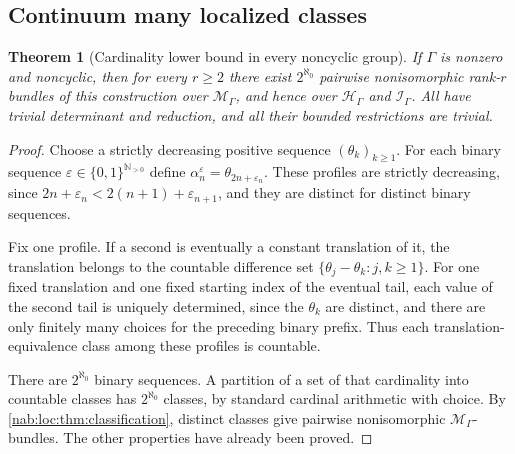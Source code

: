 \documentclass[11pt,letterpaper]{article}
\newtheorem{theorem}{Theorem}[section]
\theoremstyle{definition}
\theoremstyle{remark}
\newcommand{\N}{\mathbb N}
\newcommand{\HH}{\mathscr H_\Gamma}
\newcommand{\II}{\mathscr I_\Gamma}
\newcommand{\MM}{\mathscr M_\Gamma}
\numberwithin{equation}{section}
\begin{document}
\subsection{Continuum many localized classes}

\begin{theorem}[Cardinality lower bound in every noncyclic group]
\label{nab:loc:thm:continuum}
If $\Gamma$ is nonzero and noncyclic, then for every $r\geq2$ there exist
$2^{\aleph_0}$ pairwise nonisomorphic rank-$r$ bundles of this construction
over $\MM$, and hence over $\HH$ and $\II$. All have trivial determinant and
reduction, and all their bounded restrictions are trivial.
\end{theorem}

\begin{proof}
Choose a strictly decreasing positive sequence $(\theta_k)_{k\geq1}$. For each
binary sequence $\varepsilon\in\{0,1\}^{\N_{>0}}$ define
$\alpha_n^{\varepsilon}=\theta_{2n+\varepsilon_n}$. These profiles are strictly
decreasing, since $2n+\varepsilon_n<2(n+1)+\varepsilon_{n+1}$, and they are
distinct for distinct binary sequences.

Fix one profile. If a second is eventually a constant translation of it, the
translation belongs to the countable difference set
$\{\theta_j-\theta_k:j,k\geq1\}$. For one fixed translation and one fixed
starting index of the eventual tail, each value of the second tail is uniquely
determined, since the $\theta_k$ are distinct, and there are only finitely many
choices for the preceding binary prefix. Thus each translation-equivalence class
among these profiles is countable.

There are $2^{\aleph_0}$ binary sequences. A partition of a set of that
cardinality into countable classes has $2^{\aleph_0}$ classes, by standard
cardinal arithmetic with choice. By \cref{nab:loc:thm:classification},
distinct classes give pairwise nonisomorphic $\MM$-bundles. The other
properties have already been proved.
\end{proof}
\end{document}
